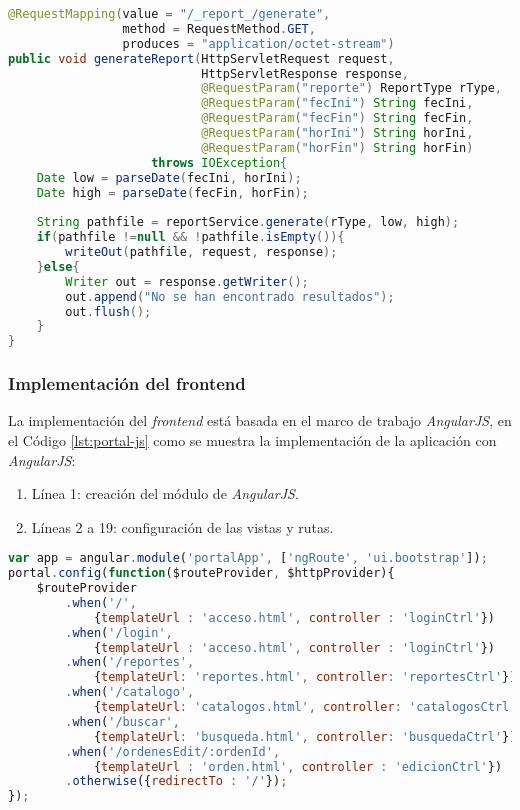 \begin{enumerate}
\begin{lstlisting}[language=Java, caption={Servicio web para generar un reporte.}, captionpos=b, label={lst:report-controller-gen}]
@RequestMapping(value = "/_report_/generate",
				method = RequestMethod.GET,
				produces = "application/octet-stream")
public void generateReport(HttpServletRequest request,
						   HttpServletResponse response,
						   @RequestParam("reporte") ReportType rType,
						   @RequestParam("fecIni") String fecIni,
						   @RequestParam("fecFin") String fecFin,
						   @RequestParam("horIni") String horIni,
						   @RequestParam("horFin") String horFin)
					throws IOException{
	Date low = parseDate(fecIni, horIni);
	Date high = parseDate(fecFin, horFin);
	
	String pathfile = reportService.generate(rType, low, high);
	if(pathfile !=null && !pathfile.isEmpty()){
		writeOut(pathfile, request, response);
	}else{
		Writer out = response.getWriter();
		out.append("No se han encontrado resultados");
		out.flush();
	}
}
\end{lstlisting}

\end{enumerate}


\subsubsection{Implementación del frontend}\label{sec:frontend}
La implementación del \textit{frontend} está basada en el marco de trabajo \textit{AngularJS}, en el Código \ref{lst:portal-js} como se muestra la implementación de la aplicación con \textit{AngularJS}:
\begin{enumerate}
	\item Línea 1: creación del módulo de \textit{AngularJS}.
	\item Líneas 2 a 19: configuración de las vistas y rutas.
\end{enumerate}
\begin{lstlisting}[language=Javascript, caption={Módulo de \textit{AngularJS} para el \textbf{Portal Web}}, captionpos=b, label={lst:portal-js}]
var app = angular.module('portalApp', ['ngRoute', 'ui.bootstrap']);
portal.config(function($routeProvider, $httpProvider){
	$routeProvider
		.when('/',
			{templateUrl : 'acceso.html', controller : 'loginCtrl'})
		.when('/login',
			{templateUrl : 'acceso.html', controller : 'loginCtrl'})
		.when('/reportes',
			{templateUrl: 'reportes.html', controller: 'reportesCtrl'})
		.when('/catalogo',
			{templateUrl: 'catalogos.html', controller: 'catalogosCtrl'})
		.when('/buscar',
			{templateUrl: 'busqueda.html', controller: 'busquedaCtrl'})
		.when('/ordenesEdit/:ordenId',
			{templateUrl : 'orden.html', controller : 'edicionCtrl'})
		.otherwise({redirectTo : '/'});
});
\end{lstlisting}

